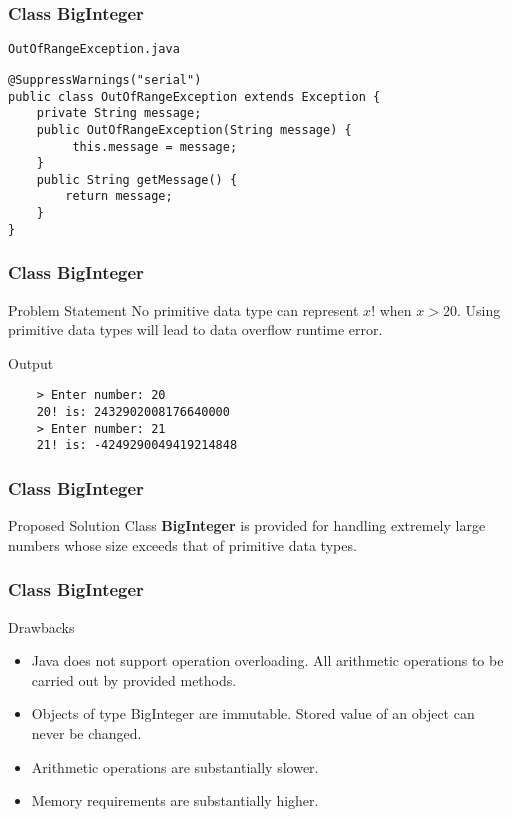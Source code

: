 \documentclass[10pt, compress]{beamer}
\begin{document}
\begin{frame}[fragile]
\frametitle{Class BigInteger}
	\begin{block}{\texttt{OutOfRangeException.java}}
		\begin{verbatim}
@SuppressWarnings("serial")
public class OutOfRangeException extends Exception {
	private String message;
	public OutOfRangeException(String message) {
		 this.message = message;
	}
	public String getMessage() {
		return message;
	}
}
		\end{verbatim}
	\end{block}
\end{frame}

\begin{frame}[fragile]
\frametitle{Class BigInteger}
	\begin{block}{Problem Statement}
		No primitive data type can represent $x!$ when $x > 20$. Using primitive data types will lead to data overflow runtime error.
	\end{block}
	\begin{block}{Output}
	\begin{verbatim}
	> Enter number: 20
	20! is: 2432902008176640000
	> Enter number: 21
	21! is: -4249290049419214848
	\end{verbatim}
	\end{block}
\end{frame}

\begin{frame}[fragile]
\frametitle{Class BigInteger}
	\begin{block}{Proposed Solution}
		Class \textbf{BigInteger} is provided for handling extremely large numbers whose size exceeds that of primitive data types.
	\end{block}
\end{frame}

\begin{frame}[fragile]
\frametitle{Class BigInteger}
	\begin{block}{Drawbacks}
		\begin{itemize}
			\item[] Java does not support operation overloading. All arithmetic operations to be carried out by provided methods.
			\item[] Objects of type BigInteger are immutable. Stored value of an object can never be changed.
			\item[] Arithmetic operations are substantially slower.
			\item[] Memory requirements are substantially higher.
		\end{itemize}
	\end{block}
\end{frame}
\end{document}
